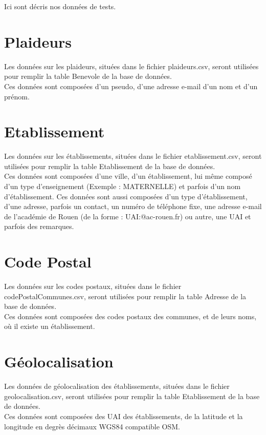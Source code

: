 Ici sont décris nos données de tests.

\section{Plaideurs}
	Les données sur les plaideurs, situées dans le fichier plaideurs.csv, seront utilisées pour remplir la table Benevole de la base de données. \\
	
	Ces données sont composées d'un pseudo, d'une adresse e-mail d'un nom et d'un prénom.	
\section{Etablissement}
	Les données sur les établissements, situées dans le fichier etablissement.csv, seront utilisées pour remplir la table Etablissement de la base de données. \\
	
	Ces données sont composées d'une ville, d'un établissement, lui même composé d'un type d'enseignement (Exemple : MATERNELLE) et parfois d'un nom d'établissement. Ces données sont aussi composées d'un type d'établissement, d'une adresse, parfois un contact, un numéro de téléphone fixe, une adresse e-mail de l'académie de Rouen (de la forme : UAI:@ac-rouen.fr) ou autre, une UAI et parfois des remarques.
	
\section{Code Postal}
	Les données sur les codes postaux, situées dans le fichier codePostalCommunes.csv, seront utilisées pour remplir la table Adresse de la base de données. \\
	
	Ces données sont composées des codes postaux des communes, et de leurs noms, où il existe un établissement.
	
\section{Géolocalisation}
	Les données de géolocalisation des établissements, situées dans le fichier geolocalisation.csv, seront utilisées pour remplir la table Etablissement de la base de données. \\
	
	Ces données sont composées des UAI des établissements, de la latitude et la longitude en degrès décimaux WGS84 compatible OSM.
	
